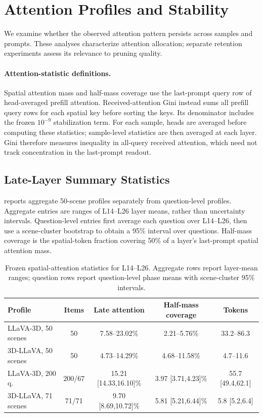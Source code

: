 \section{Attention Profiles and Stability}
\label{sec:supp_profiles}

We examine whether the observed attention pattern persists across samples and prompts. These analyses characterize attention allocation; separate retention experiments assess its relevance to pruning quality.

\paragraph{Attention-statistic definitions.} Spatial attention mass and half-mass coverage use the last-prompt query row of head-averaged prefill attention. Received-attention Gini instead sums all prefill query rows for each spatial key before sorting the keys. Its denominator includes the frozen $10^{-9}$ stabilization term. For each sample, heads are averaged before computing these statistics; sample-level statistics are then averaged at each layer. Gini therefore measures inequality in all-query received attention, which need not track concentration in the last-prompt readout.



\subsection{Late-Layer Summary Statistics}
 reports aggregate 50-scene profiles separately from question-level profiles. Aggregate entries are ranges of L14--L26 layer means, rather than uncertainty intervals. Question-level entries first average each question over L14--L26, then use a scene-cluster bootstrap to obtain a 95\% interval over questions. Half-mass coverage is the spatial-token fraction covering 50\% of a layer's last-prompt spatial attention mass.

\begin{table}[t]
\centering
\small
\caption{Frozen spatial-attention statistics for L14--L26. Aggregate rows report layer-mean ranges; question rows report question-level phase means with scene-cluster 95\% intervals.}
\label{tab:supp_profile_statistics}
\begin{tabular}{lcccc}
\toprule
Profile & Items & Late attention & Half-mass coverage & Tokens \\
\midrule
LLaVA-3D, 50 scenes & 50 & 7.58--23.02\% & 2.21--5.76\% & 33.2--86.3 \\
3D-LLaVA, 50 scenes & 50 & 4.73--14.29\% & 4.68--11.58\% & 4.7--11.6 \\
LLaVA-3D, 200 q. & 200/67 & 15.21 [14.33,16.10]\% &
3.97 [3.71,4.23]\% & 55.7 [49.4,62.1] \\
3D-LLaVA, 71 scenes & 71/71 & 9.70 [8.69,10.72]\% &
5.81 [5.21,6.44]\% & 5.8 [5.2,6.4] \\
\bottomrule
\end{tabular}
\end{table}

